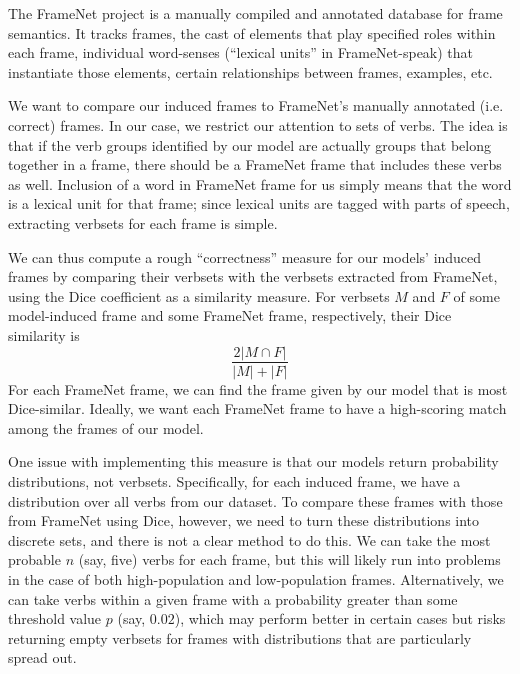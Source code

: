 \documentclass{article} %
\begin{document}

The FrameNet project is a manually compiled and annotated database for frame semantics. It tracks frames, the cast of elements that play specified roles within each frame, individual word-senses (``lexical units'' in FrameNet-speak) that instantiate those elements, certain relationships between frames, examples, etc. 

We want to compare our induced frames to FrameNet's manually annotated (i.e. correct) frames.
In our case, we restrict our attention to sets of verbs.
The idea is that if the verb groups identified by our model are actually groups that belong together in a frame, there should be a FrameNet frame that includes these verbs as well. Inclusion of a word in FrameNet frame for us simply means that the word is a lexical unit for that frame; since lexical units are tagged with parts of speech, extracting verbsets for each frame is simple.

We can thus compute a rough ``correctness'' measure for our models' induced frames by comparing their verbsets with the verbsets extracted from FrameNet, using the Dice coefficient as a similarity measure. For verbsets $M$ and $F$ of some model-induced frame and some FrameNet frame, respectively, their Dice similarity is \[\frac{2|M\cap F|}{|M|+|F|}\]
For each FrameNet frame, we can find the frame given by our model that is most Dice-similar.
Ideally, we want each FrameNet frame to have a high-scoring match among the frames of our model.

One issue with implementing this measure is that our models return probability distributions, not verbsets. Specifically, for each induced frame, we have a distribution over all verbs from our dataset. To compare these frames with those from FrameNet using Dice, however, we need to turn these distributions into discrete sets, and there is not a clear method to do this.
We can take the most probable $n$ (say, five) verbs for each frame, but this will likely run into problems in the case of both high-population and low-population frames. Alternatively, we can take verbs within a given frame with a probability greater than some threshold value $p$ (say, $0.02$), which may perform better in certain cases but risks returning empty verbsets for frames with distributions that are particularly spread out.
\end{document}
